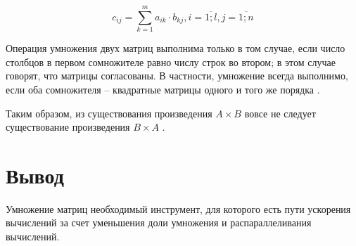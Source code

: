 \begin{equation}\label{res}
	c_{ij} = \sum_{k=1}^m a_{ik} \cdot b_{kj}, i = \overline{1;l}, j = \overline{1;n}
\end{equation}

Операция умножения двух матриц выполнима только в том случае, если число столбцов в первом сомножителе равно числу строк во втором; в этом случае говорят, что матрицы согласованы. В частности, умножение всегда выполнимо, если оба сомножителя -- квадратные матрицы одного и того же порядка \cite{litr}.

Таким образом, из существования произведения $A \times B$ вовсе не следует существование произведения $B \times A$ \cite{litr}.

\begin{comment}


Помимо обычного перемножения матриц по формуле существуют модификации, работающие быстрее. Рассмотрим в данной лабораторной работе алгоритм Винограда, являющийся одним из самых эффективных по времени алгоритмов умножения матриц \cite{haskell}, и ее оптимизацию. Этот алгоритм основывается на подготовке вычислений перед вычислением
результирующей матрицы. Если разложить формулу \ref{res} на суммы, то получается результат, видимый в формуле \ref{vinres}.

\begin{equation}\label{vinres}
	c_{ij} =
	\sum_{k=1}^{\frac{n}{2}} (a_{i,2k-1} + b_{2k,j}) (a_{i,2k} + b_{2k-1,j})-\underbrace{\sum_{k=1}^{\frac{n}{2}} a_{i,2k-1} a_{i,2k} -
		\sum_{k=1}^{\frac{n}{2}} b_{2k-1,j} b_{2k,j}}_\text{Можно вычислить заранее}
\end{equation}

Таким образом, можно заранее вычислить две последние суммы, поскольку они вычисляются многократно для каждой строки в одном столбце в случае первой и для каждого столбца из одной строки в случае второй сумм, что уменьшает долю умножения\cite{haskell}. Также можно заметить, что вычисление каждого нового элемента результирующей матрицы не влияет на вычисление следующих, то есть каждый элемент матрицы считается отдельно. По этой причине можно проделать действия по распараллеливанию вычислений и тем самым увеличить скорость расчета результата.
\end{comment}

\section*{Вывод}

Умножение матриц необходимый инструмент, для которого есть пути ускорения вычислений за счет уменьшения доли умножения и распараллеливания вычислений.
